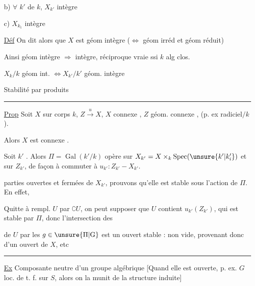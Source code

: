 b) $\forall$  $k'$ de $k$, $X_{k'}$ intègre

c)  $X_{k_1}$ intègre

\uline{Déf} On dit alors que $X$ est géom intègre ($\Longleftrightarrow$ géom irréd et géom réduit)

Ainsi géom intègre $\Rightarrow$ intègre, réciproque vraie ssi $k$ alg clos.

$X_k/k$ géom int. $\Longleftrightarrow X_{k'}/k'$ géom. intègre

Stabilité par produits

\par\noindent\rule{.22\linewidth}{.4pt}\par
\uline{Prop} Soit $X$ sur corps $k$, $Z\xrightarrow{u}X$, $X$ connexe , $Z$ géom. connexe , (p. ex  radiciel$/k$).

\noindent\vrule\enspace Alors $X$ est  connexe .

Soit $k'$  . Alors $\Pi=\operatorname{Gal}(k'/k)$ opère sur $X_{k'}=X\times_k\operatorname{Spec}(\unsure{k'|k'_i})$ et sur $Z_{k'}$, de façon à commuter à $u_{k'}: Z_{k'} - X_{k'}$.

  parties ouvertes et fermées de $X_{k'}$,     prouvons qu'elle est stable sous l'action de $\Pi$. En effet,

 Quitte à rempl. $U$ par $\complement U$, on peut supposer que $U$ contient $u_{k'}(Z_{k'})$, qui est stable par $\Pi$, donc l'intersection  des

  de $U$ par les $g\in \unsure{\Pi|\mathrm{G}}$ est un ouvert stable  :  non vide, provenant donc d'un ouvert  de $X$, etc

\par\noindent\rule{.94\linewidth}{.4pt}\par
\uline{Ex} Composante neutre  d'un groupe algébrique \deleted{[elle est quasi-compacte} [Quand elle est ouverte, p. ex. $G$ loc. de t. f. sur $S$, alors on la munit de la structure induite]

